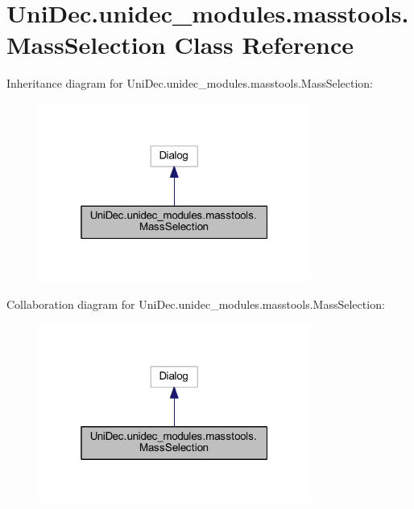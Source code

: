 \hypertarget{class_uni_dec_1_1unidec__modules_1_1masstools_1_1_mass_selection}{}\section{Uni\+Dec.\+unidec\+\_\+modules.\+masstools.\+Mass\+Selection Class Reference}
\label{class_uni_dec_1_1unidec__modules_1_1masstools_1_1_mass_selection}


Inheritance diagram for Uni\+Dec.\+unidec\+\_\+modules.\+masstools.\+Mass\+Selection\+:\nopagebreak
\begin{figure}[H]
\begin{center}
\leavevmode
\includegraphics[width=253pt]{class_uni_dec_1_1unidec__modules_1_1masstools_1_1_mass_selection__inherit__graph}
\end{center}
\end{figure}


Collaboration diagram for Uni\+Dec.\+unidec\+\_\+modules.\+masstools.\+Mass\+Selection\+:\nopagebreak
\begin{figure}[H]
\begin{center}
\leavevmode
\includegraphics[width=253pt]{class_uni_dec_1_1unidec__modules_1_1masstools_1_1_mass_selection__coll__graph}
\end{center}
\end{figure}
